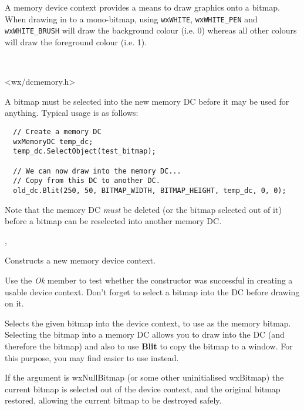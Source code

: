 \section{}\label{wxmemorydc}

A memory device context provides a means to draw graphics onto a bitmap. When
drawing in to a mono-bitmap, using {\tt wxWHITE}, {\tt wxWHITE\_PEN} and
{\tt wxWHITE\_BRUSH}
will draw the background colour (i.e. 0) whereas all other colours will draw the
foreground colour (i.e. 1).


\\


<wx/dcmemory.h>


A bitmap must be selected into the new memory DC before it may be used
for anything.  Typical usage is as follows:

\begin{verbatim}
  // Create a memory DC
  wxMemoryDC temp_dc;
  temp_dc.SelectObject(test_bitmap);

  // We can now draw into the memory DC...
  // Copy from this DC to another DC.
  old_dc.Blit(250, 50, BITMAP_WIDTH, BITMAP_HEIGHT, temp_dc, 0, 0);
\end{verbatim}

Note that the memory DC {\it must} be deleted (or the bitmap selected out of it) before a bitmap
can be reselected into another memory DC.


, 




Constructs a new memory device context.

Use the {\it Ok} member to test whether the constructor was successful
in creating a usable device context. Don't forget to select a bitmap
into the DC before drawing on it.



Selects the given bitmap into the device context, to use as the memory
bitmap. Selecting the bitmap into a memory DC allows you to draw into
the DC (and therefore the bitmap) and also to use {\bf Blit} to copy
the bitmap to a window. For this purpose, you may find \rtfsp
easier to use instead.

If the argument is wxNullBitmap (or some other uninitialised wxBitmap) the current bitmap is selected out of the device
context, and the original bitmap restored, allowing the current bitmap to
be destroyed safely.

